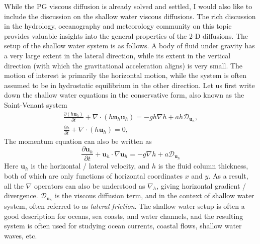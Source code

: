 While the PG viscous diffusion is already solved and settled, I would also like to include the discussion on the shallow water viscous diffusions. The rich discussion in the hydrology, oceanography and meteorology community on this topic provides valuable insights into the general properties of the 2-D diffusions. The setup of the shallow water system is as follows. A body of fluid under gravity has a very large extent in the lateral direction, while its extent in the vertical direction (with which the gravitational acceleration aligns) is very small. The motion of interest is primarily the horizontal motion, while the system is often assumed to be in hydrostatic equilibrium in the other direction. Let us first write down the shallow water equations in the conservative form, also known as the Saint-Venant system \parencite{gerbeau_derivation_2001,gilbert_form_2014}
\begin{equation}\label{eqn:SW-SV}
\begin{gathered}
    \frac{\partial (h\mathbf{u}_h)}{\partial t} + \nabla\cdot \left(h \mathbf{u}_h \mathbf{u}_h\right) = - gh \nabla h + a h \mathcal{D}_{\mathbf{u}_h}, \\ 
    \frac{\partial h}{\partial t} + \nabla\cdot (h \mathbf{u}_h) = 0,
\end{gathered}
\end{equation}
The momentum equation can also be written as
\begin{equation}
    \frac{\partial \mathbf{u}_h}{\partial t} + \mathbf{u}_h\cdot \nabla \mathbf{u}_h = -g\nabla h + a \mathcal{D}_{\mathbf{u}_h}
\end{equation}
Here $\mathbf{u}_h$ is the horizontal / lateral velocity, and $h$ is the fluid column thickness, both of which are only functions of horizontal coordinates $x$ and $y$. As a result, all the $\nabla$ operators can also be understood as $\nabla_h$, giving horizontal gradient / divergence. $\mathcal{D}_{\mathbf{u}_h}$ is the viscous diffusion term, and in the context of shallow water system, often referred to as \textit{lateral friction}. The shallow water setup is often a good description for oceans, sea coasts, and water channels, and the resulting system is often used for studying ocean currents, coastal flows, shallow water waves, etc.

